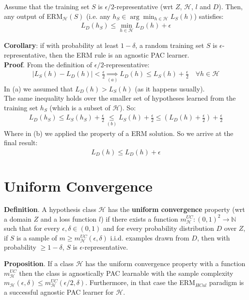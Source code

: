 \documentclass[../template.tex]{subfiles}
\begin{document}
\begin{thm}
    Assume that the training set $S$ is $\epsilon/2$-representative (wrt $Z$, $\mathcal{H}$, $l$ and $D$). Then, any output of ERM$_{\mathcal{H}}(S)$ (i.e. any $h_S \in \arg\min_{h\in \mathcal{H}} L_S(h)$) satisfies:
    \begin{align*}
        L_D(h_S) \leq \min_{h \in \mathcal{H}} L_D(h) + \epsilon
    \end{align*}  
\end{thm}
\textbf{Corollary}: if with probability at least $1-\delta$, a random training set $S$ is $\epsilon$-representative, then the ERM rule is an agnostic PAC learner.\\

\textbf{Proof}. From the definition of $\epsilon/2$-representative:
\begin{align*}
    |L_S(h) - L_D(h)| < \frac{\epsilon}{2} \underset{(a)}{\Rightarrow}  L_D(h) \leq L_S(h) + \frac{\epsilon}{2} \quad \forall h \in \mathcal{H}
\end{align*} 
In (a) we assumed that $L_D(h) > L_S(h)$ (as it happens usually).\\
The same inequality holds over the smaller set of hypotheses learned from the training set $h_S$ (which is a subset of $\mathcal{H}$). So:
\begin{align*}
    L_D(h_S) \leq L_S(h_S) + \frac{\epsilon}{2} \underset{(b)}{\leq}  L_S(h) + \frac{\epsilon}{2}  \leq \left( L_D(h) + \frac{\epsilon}{2}\right) + \frac{\epsilon}{2}  
\end{align*} 
Where in (b) we applied the property of a ERM solution. So we arrive at the final result:
\begin{align*}
    L_D(h) \leq L_D(h) + \epsilon
\end{align*}

\section{Uniform Convergence}
\textbf{Definition}. A hypothesis class $\mathcal{H}$ has the \textbf{uniform convergence} property (wrt a domain $Z$ and a loss function $l$) if there exists a function $m_{\mathcal{H}}^{UC}\colon (0,1)^2 \to \mathbb{N}$ such that for every $\epsilon, \delta \in (0,1)$ and for every probability distribution $D$ over $Z$, if $S$ is a sample of $m \geq m_{\mathcal{H}}^{UC}(\epsilon, \delta)$ i.i.d. examples drawn from $D$, then with probability $\geq 1-\delta$, $S$ is $\epsilon$-representative. 


\textbf{Proposition}. If a class $\mathcal{H}$ has the uniform convergence property with a function $m_{\mathcal{H}}^{UC}$ then the class is agnostically PAC learnable with the sample complexity $m_{\mathcal{H}}(\epsilon, \delta) \leq m_{\mathcal{H}}^{UC}(\epsilon/2, \delta)$. Furthermore, in that case the ERM$_{HCal}$ paradigm is a successful agnostic PAC learner for $\mathcal{H}$.\\
\end{document}
